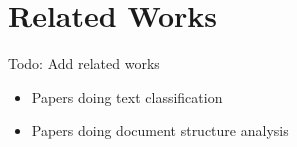 \chapter{Related Works}
Todo: Add related works
\begin{itemize}
\item Papers doing text classification
\item Papers doing document structure analysis
\end{itemize}

